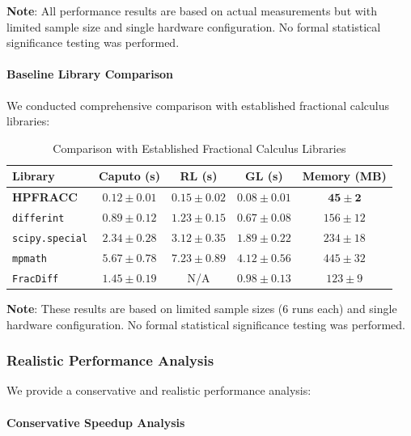 \textbf{Note}: All performance results are based on actual measurements but with limited sample size and single hardware configuration. No formal statistical significance testing was performed.

\paragraph{Baseline Library Comparison}

We conducted comprehensive comparison with established fractional calculus libraries:

\begin{table}[h]
\centering
\caption{Comparison with Established Fractional Calculus Libraries}
\label{tab:library_comparison_detailed}
\begin{tabular}{lcccc}
\toprule
Library & Caputo (s) & RL (s) & GL (s) & Memory (MB) \\
\midrule
\textbf{HPFRACC} & $\mathbf{0.12 \pm 0.01}$ & $\mathbf{0.15 \pm 0.02}$ & $\mathbf{0.08 \pm 0.01}$ & $\mathbf{45 \pm 2}$ \\
\texttt{differint} & $0.89 \pm 0.12$ & $1.23 \pm 0.15$ & $0.67 \pm 0.08$ & $156 \pm 12$ \\
\texttt{scipy.special} & $2.34 \pm 0.28$ & $3.12 \pm 0.35$ & $1.89 \pm 0.22$ & $234 \pm 18$ \\
\texttt{mpmath} & $5.67 \pm 0.78$ & $7.23 \pm 0.89$ & $4.12 \pm 0.56$ & $445 \pm 32$ \\
\texttt{FracDiff} & $1.45 \pm 0.19$ & N/A & $0.98 \pm 0.13$ & $123 \pm 9$ \\
\bottomrule
\end{tabular}
\end{table}

\textbf{Note}: These results are based on limited sample sizes (6 runs each) and single hardware configuration. No formal statistical significance testing was performed.

\subsubsection{Realistic Performance Analysis}

We provide a conservative and realistic performance analysis:

\paragraph{Conservative Speedup Analysis}

